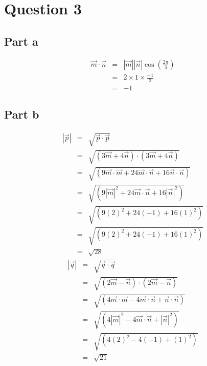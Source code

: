 \section*{Question 3}
\subsection*{Part a}
\begin{eqnarray*}
  \overrightarrow{m} \cdot \overrightarrow{n} &=& |\overrightarrow{m}| |\overrightarrow{n}| \cos(\frac{2 \pi}{3}) \\
                                              &=& 2 \times 1 \times \frac{-1}{2} \\
                                              &=& -1
\end{eqnarray*}
\subsection*{Part b}
\begin{eqnarray*}
  |\overrightarrow{p}| &=& \sqrt{\overrightarrow{p} \cdot \overrightarrow{p}} \\
                       &=& \sqrt{(3\overrightarrow{m} + 4\overrightarrow{n}) \cdot (3\overrightarrow{m} + 4\overrightarrow{n})} \\
                       &=& \sqrt{(9\overrightarrow{m} \cdot \overrightarrow{m} + 24\overrightarrow{m} \cdot\overrightarrow{n} + 16\overrightarrow{n} \cdot \overrightarrow{n})} \\
                       &=& \sqrt{(9|\overrightarrow{m}|^2 + 24\overrightarrow{m} \cdot\overrightarrow{n} + 16|\overrightarrow{n}|^2)} \\
                       &=& \sqrt{(9(2)^2 + 24(-1) + 16(1)^2)} \\
                       &=& \sqrt{(9(2)^2 + 24(-1) + 16(1)^2)} \\
                       &=& \sqrt{28}
\end{eqnarray*}
\begin{eqnarray*}
  |\overrightarrow{q}| &=& \sqrt{\overrightarrow{q} \cdot \overrightarrow{q}} \\
                       &=& \sqrt{(2\overrightarrow{m} - \overrightarrow{n}) \cdot (2\overrightarrow{m} - \overrightarrow{n})} \\
                       &=& \sqrt{(4\overrightarrow{m} \cdot \overrightarrow{m}  - 4\overrightarrow{m} \cdot\overrightarrow{n} + \overrightarrow{n} \cdot \overrightarrow{n})} \\
                       &=& \sqrt{(4|\overrightarrow{m}|^2 - 4\overrightarrow{m} \cdot\overrightarrow{n} + |\overrightarrow{n}|^2)} \\
                       &=& \sqrt{(4(2)^2 - 4(-1) + (1)^2)} \\
                       &=& \sqrt{21}
\end{eqnarray*}
